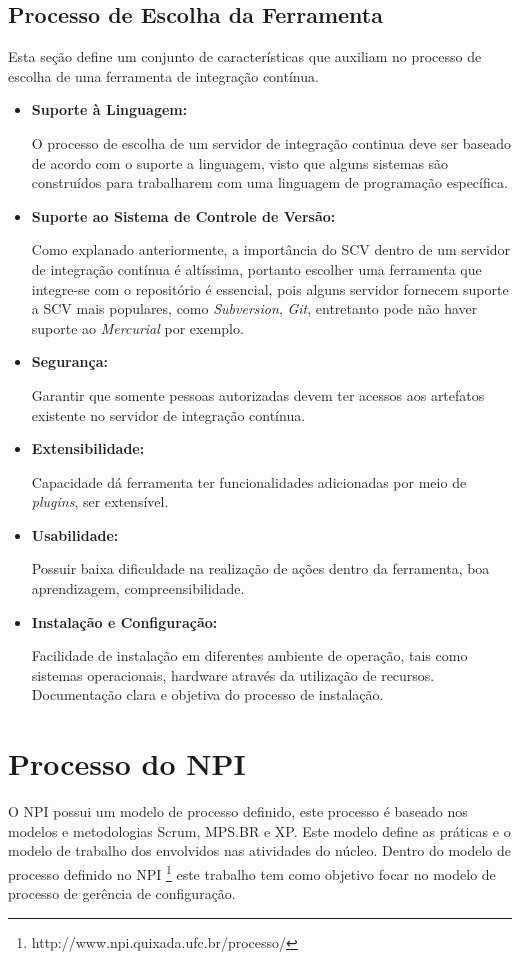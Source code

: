 \subsection{Processo de Escolha da Ferramenta}\label{escolhaFerramenta}
Esta seção define um conjunto de características que auxiliam no processo de escolha de uma ferramenta de integração contínua.
\begin{itemize}
\item {\textbf{Suporte à Linguagem:}}

O processo de escolha de um servidor de integração continua deve ser baseado de acordo com o suporte a linguagem, visto que alguns sistemas são construídos para trabalharem com uma linguagem de programação específica.

\item {\textbf{Suporte ao Sistema de Controle de Versão:}}

Como explanado anteriormente, a importância do SCV dentro de um servidor de integração contínua é altíssima, portanto escolher uma ferramenta que integre-se com o repositório é essencial, pois alguns servidor fornecem suporte a SCV mais populares, como \textit{Subversion}, \textit{Git}, entretanto pode não haver suporte ao \textit{Mercurial} por exemplo.


\item {\textbf{Segurança:}}

Garantir que somente pessoas autorizadas devem ter acessos aos artefatos existente no servidor de integração contínua.

\item {\textbf{Extensibilidade:}}

Capacidade dá ferramenta ter funcionalidades adicionadas por meio de \textit{plugins}, ser extensível.

\item {\textbf{Usabilidade:}}

Possuir baixa dificuldade na realização de ações dentro da ferramenta, boa aprendizagem, compreensibilidade.

\item {\textbf{Instalação e Configuração:}}

Facilidade de instalação em diferentes ambiente de operação, tais como sistemas operacionais, hardware através da utilização de recursos. Documentação clara e objetiva do processo de instalação.


\end{itemize}

\section{Processo do NPI}\label{processonpi}
O NPI possui um modelo de processo definido, este processo é baseado nos modelos e metodologias Scrum, MPS.BR e XP. Este modelo define as práticas e o modelo de trabalho dos envolvidos nas atividades do núcleo. Dentro do modelo de processo definido no NPI \footnote{http://www.npi.quixada.ufc.br/processo/} este trabalho tem como objetivo focar no modelo de processo de gerência de configuração.

